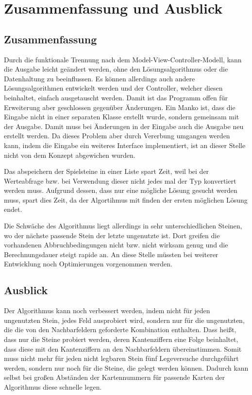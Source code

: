 \chapter{Zusammenfassung und Ausblick}
\label{chap:ZusammenfassungAusblick}
\section{Zusammenfassung}
\label{sec:Zusammenfassung}
Durch die funktionale Trennung nach dem Model-View-Controller-Modell, kann die Ausgabe leicht geändert werden, ohne den Lösungsalgorithmus oder die Datenhaltung zu beeinflussen. Es können allerdings auch andere Lösungsalgorithmen entwickelt werden und der Controller, welcher diesen beinhaltet, einfach ausgetauscht werden. Damit ist das Programm offen für Erweiterung aber geschlossen gegenüber Änderungen. 
Ein Manko ist, dass die Eingabe nicht in einer separaten Klasse erstellt wurde, sondern gemeinsam mit der Ausgabe. Damit muss bei Änderungen in der Eingabe auch die Ausgabe neu erstellt werden. Da dieses Problem aber durch Vererbung umgangen werden kann, indem die Eingabe ein weiteres Interface implementiert, ist an dieser Stelle nicht von dem Konzept abgewichen wurden.

Das abspeichern der Spielsteine in einer Liste spart Zeit, weil bei der Werteabfrage bzw. bei Verwendung dieser nicht jedes mal der Typ konvertiert werden muss. Aufgrund dessen, dass nur eine mögliche Lösung gesucht werden muss, spart dies Zeit, da der Algortihmus mit finden der ersten möglichen Lösung endet.

Die Schwäche des Algorithmus liegt allerdings in sehr unterschiedlichen Steinen, wo der nächste passende Stein der letzte ungenutzte ist. Dort greifen die vorhandenen Abbruchbedingungen nicht bzw. nicht wirksam genug und die Berechnungsdauer steigt rapide an. An diese Stelle müssten bei weiterer Entwicklung noch Optimierungen vorgenommen werden.
\clearpage
\section{Ausblick}
\label{sec:Ausblick}
Der Algorithmus kann noch verbessert werden, indem nicht für jeden ungenutzten Stein, jedes Feld ausprobiert wird, sondern nur für die ungenutzten, die die von den Nachbarfeldern geforderte Kombination enthalten. Dass heißt, dass nur die Steine probiert werden, deren Kantenziffern eine Folge beinhaltet, dass diese mit den Kantenziffern an den Nachbarfeldern übereinstimmen. Somit muss nicht mehr für jeden nicht legbaren Stein fünf Legeversuche durchgeführt werden, sondern nur noch für die Steine, die gelegt werden können. Dadurch kann selbst bei großen Abständen der Kartennummern für passende Karten der Algorithmus diese schnelle legen.

